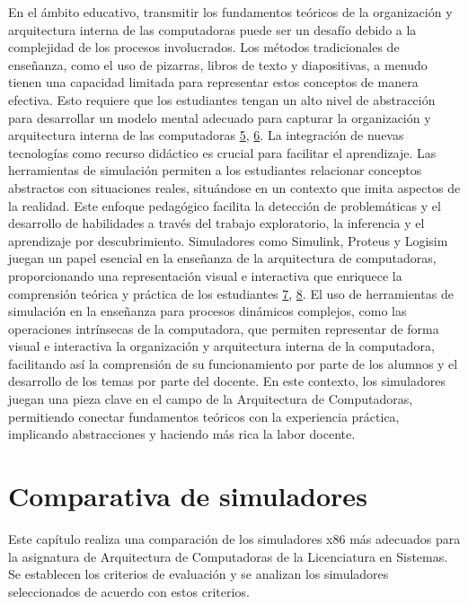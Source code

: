 \documentclass[12pt,twoside]{templates/unerthesis}
\begin{document}
En el ámbito educativo, transmitir los fundamentos teóricos de la organización y arquitectura interna de las computadoras puede ser un desafío debido a la complejidad de los procesos involucrados. Los métodos tradicionales de enseñanza, como el uso de pizarras, libros de texto y diapositivas, a menudo tienen una capacidad limitada para representar estos conceptos de manera efectiva. Esto requiere que los estudiantes tengan un alto nivel de abstracción para desarrollar un modelo mental adecuado para capturar la organización y arquitectura interna de las computadoras \protect\hyperlink{ref-lion_simuladores_2005}{5}, \protect\hyperlink{ref-contreras_uso_2010}{6}.
La integración de nuevas tecnologías como recurso didáctico es crucial para facilitar el aprendizaje. Las herramientas de simulación permiten a los estudiantes relacionar conceptos abstractos con situaciones reales, situándose en un contexto que imita aspectos de la realidad. Este enfoque pedagógico facilita la detección de problemáticas y el desarrollo de habilidades a través del trabajo exploratorio, la inferencia y el aprendizaje por descubrimiento. Simuladores como Simulink, Proteus y Logisim juegan un papel esencial en la enseñanza de la arquitectura de computadoras, proporcionando una representación visual e interactiva que enriquece la comprensión teórica y práctica de los estudiantes \protect\hyperlink{ref-garcia-garcia_pbbcache_2020}{7}, \protect\hyperlink{ref-nova_tool_2013}{8}.
El uso de herramientas de simulación en la enseñanza para procesos dinámicos complejos, como las operaciones intrínsecas de la computadora, que permiten representar de forma visual e interactiva la organización y arquitectura interna de la computadora, facilitando así la comprensión de su funcionamiento por parte de los alumnos y el desarrollo de los temas por parte del docente. En este contexto, los simuladores juegan una pieza clave en el campo de la Arquitectura de Computadoras, permitiendo conectar fundamentos teóricos con la experiencia práctica, implicando abstracciones y haciendo más rica la labor docente.

\hypertarget{comparativa-de-simuladores}{%
\chapter{Comparativa de simuladores}\label{comparativa-de-simuladores}}

Este capítulo realiza una comparación de los simuladores x86 más adecuados para la asignatura de Arquitectura de Computadoras de la Licenciatura en Sistemas. Se establecen los criterios de evaluación y se analizan los simuladores seleccionados de acuerdo con estos criterios.
\end{document}
